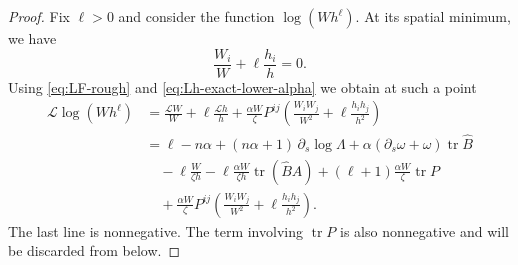 \documentclass[11pt, reqno]{amsart}
\theoremstyle{remark}
\theoremstyle{definition}
\numberwithin{equation}{section}
\DeclareMathOperator{\tr}{tr}
\begin{document}
\begin{proof}
Fix $\ell>0$ and consider the function $\log(Wh^\ell)$. At its spatial minimum,  we have
\begin{equation}\label{eq:min-condition-Fh-alpha}
        \frac{W_i}{W}+\ell\frac{h_i}{h}=0 .
\end{equation}
Using \eqref{eq:LF-rough} and \eqref{eq:Lh-exact-lower-alpha} we obtain at such a point
\begin{align}
       \mathcal L\log(Wh^\ell)
        &=
        \frac{\mathcal L W}{W}
        +\ell\frac{\mathcal L h}{h}
        +\frac{\alpha W}{\zeta}P^{ij}
          \left(
             \frac{W_iW_j}{W^2}
             +\ell\frac{h_i h_j}{h^2}
          \right)                        \nonumber              \\
        &=
        \ell-n\alpha
        +(n\alpha+1)\,\partial_s\log \Lambda
        +\alpha(\partial_s\omega+\omega)\tr\widehat B    \nonumber   \\
        &\quad
        -\ell\frac{W}{\zeta h}
        -\ell\frac{\alpha W}{\zeta h}\tr(\widehat B A)
        +(\ell+1)\frac{\alpha W}{\zeta}\tr P        \nonumber      \\
        &\quad
        +\frac{\alpha W}{\zeta}P^{ij}
          \left(
             \frac{W_iW_j}{W^2}
             +\ell\frac{h_i h_j}{h^2}
          \right).           \label{eq:LlogFh-exact-alpha}
\end{align}
The last line is nonnegative.  The term involving $\tr P$ is also
nonnegative and will be discarded from below.


\end{proof}
\end{document}
